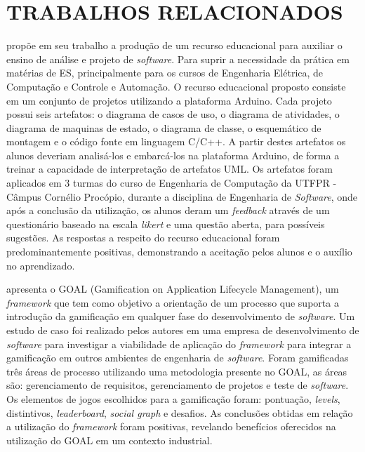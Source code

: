 \section{TRABALHOS RELACIONADOS}
\label{sec:trabalhos-relacionados}
 propõe em seu trabalho a produção de um recurso educacional para auxiliar o ensino de análise e projeto de \textit{software}. Para suprir a necessidade da prática em matérias de ES, principalmente para os cursos de Engenharia Elétrica, de Computação e Controle e Automação. O recurso educacional proposto consiste em um conjunto de projetos utilizando a plataforma Arduino. Cada projeto possui seis artefatos: o diagrama de casos de uso, o diagrama de atividades, o diagrama de maquinas de estado, o diagrama de classe, o esquemático de montagem e o código fonte em linguagem C/C++. A partir destes artefatos os alunos deveriam analisá-los e embarcá-los na plataforma Arduino, de forma a treinar a capacidade de interpretação de artefatos UML. Os artefatos foram aplicados em 3 turmas do curso de Engenharia de Computação da UTFPR - Câmpus Cornélio Procópio, durante a disciplina de Engenharia de \textit{Software}, onde após a conclusão da utilização, os alunos deram um \textit{feedback} através de um questionário baseado na escala \textit{likert} e uma questão aberta, para possíveis sugestões. As respostas a respeito do recurso educacional foram predominantemente positivas, demonstrando a aceitação pelos alunos e o auxílio no aprendizado.

 apresenta o GOAL (Gamification on Application Lifecycle Management), um \textit{framework} que tem como objetivo a orientação de um processo que suporta a introdução da gamificação em qualquer fase do desenvolvimento de \textit{software}. Um estudo de caso foi realizado pelos autores em uma empresa de desenvolvimento de \textit{software} para investigar a viabilidade de aplicação do \textit{framework} para integrar a gamificação em outros ambientes de engenharia de \textit{software}. Foram gamificadas três áreas de processo utilizando uma metodologia presente no GOAL, as áreas são: gerenciamento de requisitos, gerenciamento de projetos e teste de \textit{software}. Os elementos de jogos escolhidos para a gamificação foram: pontuação, \textit{levels}, distintivos, \textit{leaderboard}, \textit{social graph} e desafios. As conclusões obtidas em relação a utilização do \textit{framework} foram positivas, revelando benefícios oferecidos na utilização do GOAL em um contexto industrial. 

